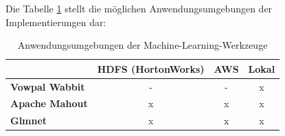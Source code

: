 Die Tabelle \ref{tab:MachineLearningTools} stellt die möglichen Anwendungsumgebungen der Implementierungen dar:

\begin{table}[H]
	\centering
\begin{tabular}{l|c|c|c} 
	\textbf{} & \textbf{HDFS (HortonWorks)} & \textbf{AWS} & \textbf{Lokal}  \\  
	\hline \textbf{Vowpal Wabbit} & - & - & x \\
	\hline \textbf{Apache Mahout} & x & x & x \\
	\hline \textbf{Glmnet} & x & x & x 
	\vspace{0.3cm} 
\end{tabular} 
\caption{Anwendungsumgebungen der Machine-Learning-Werkzeuge}
\label{tab:MachineLearningTools}
\end{table}

